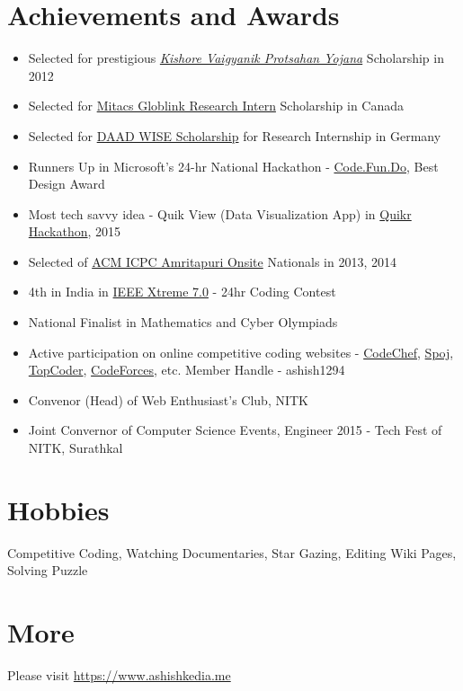 \documentclass[margin, centered]{res}
\begin{document}
\begin{resume}
\section{Achievements and Awards}
\begin{itemize}[leftmargin=*]
 \item Selected for prestigious \href{http://www.kvpy.org.in/main/}{\emph{Kishore Vaigyanik Protsahan Yojana}} Scholarship in 2012
 \item Selected for \href{https://www.mitacs.ca/en/programs/globalink/globalink-research-internship}{Mitacs Globlink Research Intern} Scholarship in Canada
 \item Selected for \href{https://www.daad.de/deutschland/stipendium/datenbank/en/21148-scholarship-database/?status=1&origin=4&subjectGrps=&daad=1&q=wise&page=1&detail=50015295}{DAAD WISE Scholarship} for Research Internship in Germany
 \item Runners Up in Microsoft's 24-hr National Hackathon - \href{https://www.acadaccelerator.com/}{Code.Fun.Do}, Best Design Award
 \item Most tech savvy idea - Quik View (Data Visualization App) in \href{http://www.venturesity.com/challenge/id/73}{Quikr Hackathon}, 2015
 \item Selected of \href{http://icpc.amrita.ac.in/2014/}{ACM ICPC Amritapuri Onsite} Nationals in 2013, 2014
 \item 4th in India in \href{http://www.ieee.org/membership_services/membership/students/competitions/xtreme/index.html}{IEEE Xtreme 7.0} - 24hr Coding Contest
 \item National Finalist in Mathematics and Cyber Olympiads
 \item Active participation on online competitive coding websites - \href{http://www.codechef.com/users/ashish1294}{CodeChef}, \href{http://www.spoj.com/users/ashish1294/}{Spoj}, \href{http://community.topcoder.com/tc?module=MemberProfile&cr=23303026}{TopCoder}, \href{http://codeforces.com/profile/ashish1294}{CodeForces}, etc. Member Handle - ashish1294
 \item Convenor (Head) of Web Enthusiast's Club, NITK
 \item Joint Convernor of Computer Science Events, Engineer 2015 - Tech Fest of NITK, Surathkal
\end{itemize}


\section{Hobbies}
Competitive Coding, Watching Documentaries, Star Gazing, Editing Wiki Pages, Solving Puzzle

\section{More}
Please visit \href{https://www.ashishkedia.me}{https://www.ashishkedia.me}

\end{resume}
\end{document}
